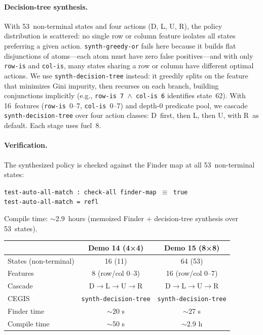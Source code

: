 \paragraph{Decision-tree synthesis.}
With 53~non-terminal states and four actions (D, L, U, R), the policy distribution is scattered: no single row or column feature isolates all states preferring a given action.
\texttt{synth-greedy-or} fails here because it builds flat disjunctions of atoms---each atom must have zero false positives---and with only \texttt{row-is} and \texttt{col-is}, many states sharing a row or column have different optimal actions.
We use \texttt{synth-decision-tree} instead: it greedily splits on the feature that minimizes Gini impurity, then recurses on each branch, building conjunctions implicitly (e.g., \texttt{row-is~7~$\wedge$~col-is~6} identifies state~62).
With 16~features (\texttt{row-is}~0--7, \texttt{col-is}~0--7) and depth-0 predicate pool, we cascade \texttt{synth-decision-tree} over four action classes: D~first, then L, then U, with R~as default.
Each stage uses fuel~8.

\paragraph{Verification.}
The synthesized policy is checked against the Finder map at all 53~non-terminal states:
\begin{center}
\texttt{test-auto-all-match : check-all finder-map $\equiv$ true}\\
\texttt{test-auto-all-match = refl}
\end{center}
Compile time: ${\sim}2.9$~hours (memoized Finder + decision-tree synthesis over 53~states).

\begin{center}
\begin{tabular}{@{}lcc@{}}
& \textbf{Demo 14 (4×4)} & \textbf{Demo 15 (8×8)} \\
\hline
States (non-terminal) & 16 (11) & 64 (53) \\
Features & 8 (row/col 0--3) & 16 (row/col 0--7) \\
Cascade & D$\to$L$\to$U$\to$R & D$\to$L$\to$U$\to$R \\
CEGIS & \texttt{synth-decision-tree} & \texttt{synth-decision-tree} \\
Finder time & ${\sim}$20 s & ${\sim}$27 s \\
Compile time & ${\sim}$50 s & ${\sim}$2.9 h \\
\end{tabular}
\end{center}

